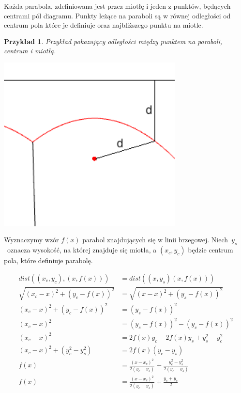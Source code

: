\documentclass[declaration,shortabstract, inz]{iithesis}
\theoremstyle{definition} \newtheorem{definition}{Definicja}[]
\theoremstyle{plain} \newtheorem{remark}[definition]{Obserwacja}
\theoremstyle{plain} \newtheorem{theorem}[definition]{Twierdzenie}
\theoremstyle{plain} \newtheorem{example}{Przykład}[definition]
\theoremstyle{plain} \newtheorem{lemma}[definition]{Lemat}
\begin{document}
Każda parabola, zdefiniowana jest przez miotłę i jeden z punktów, będących centrami pól diagramu. Punkty leżące na paraboli są w równej odległości od centrum pola które je definiuje oraz najbliższego punktu na miotle.

\begin{example}
Przykład pokazujący odległości między punktem na paraboli, centrum i miotłą.
	\begin{center}
				\includegraphics[width=0.7\textwidth]{distance}
	\end{center}
\end{example}

Wyznaczymy wzór $f(x)$ parabol znajdujących się w linii brzegowej.
Niech~$y_s$~oznacza wysokość, na której znajduje się miotła, a $(x_c, y_c)$ będzie centrum pola, które definiuje parabolę. 

\begin{align*}
	dist((x_c, y_c), (x, f(x))) &= dist((x, y_s) (x, f(x))) \\
	\sqrt{(x_c - x)^2 + (y_c - f(x))^2} &= \sqrt{(x - x)^2 + (y_s - f(x))^2} \\
	(x_c - x)^2 + (y_c - f(x))^2 &= (y_s - f(x))^2 \\
	(x_c - x)^2 &= (y_s - f(x))^2 - (y_c - f(x))^2 \\ 
	(x_c - x)^2 &= 2f(x)y_c - 2f(x)y_s + y_s^2 - y_c^2 \\
	(x_c - x)^2 + (y_c^2 - y_s^2) &= 2f(x)(y_c - y_s) \\
	f(x) &= \frac{(x - x_c)^2}{2(y_c - y_s)} + \frac{y_c^2 - y_s^2}{2(y_c - y_s)} \\
	f(x) &= \frac{(x - x_c)^2}{2(y_c - y_s)} + \frac{y_c + y_s}{2}
\end{align*}
\end{document}
